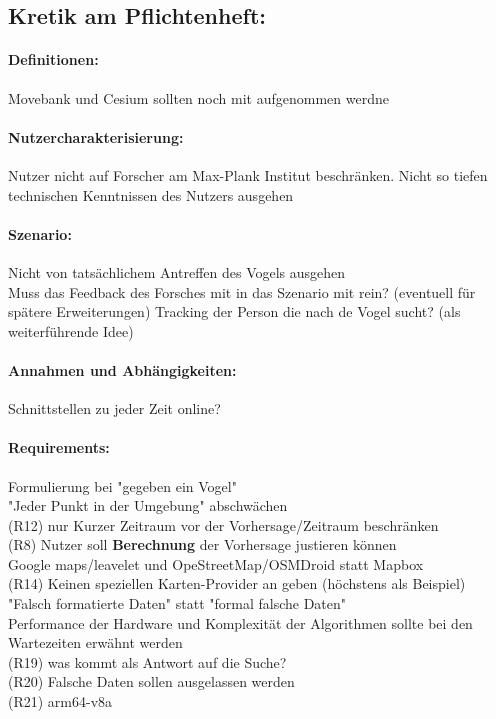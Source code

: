 \documentclass{article}
\begin{document}
	
	\subsection*{Kretik am Pflichtenheft:}
	
	\paragraph{Definitionen:}
	
	Movebank und Cesium sollten noch mit aufgenommen werdne
	
	\paragraph{Nutzercharakterisierung:}
	
	Nutzer nicht auf Forscher am Max-Plank Institut beschränken. Nicht so tiefen technischen Kenntnissen des Nutzers ausgehen
	
	\paragraph{Szenario:}
	
	Nicht von tatsächlichem Antreffen des Vogels ausgehen\\
	Muss das Feedback des Forsches mit in das Szenario mit rein? (eventuell für spätere Erweiterungen)
	Tracking der Person die nach de Vogel sucht? (als weiterführende Idee)
	
	\paragraph{Annahmen und Abhängigkeiten:}
	
	Schnittstellen zu jeder Zeit online?
	
	\paragraph{Requirements:} Formulierung bei "gegeben ein Vogel"\\
	"Jeder Punkt in der Umgebung" abschwächen\\
	(R12) nur Kurzer Zeitraum vor der Vorhersage/Zeitraum beschränken\\
	(R8) Nutzer soll \textbf{Berechnung} der Vorhersage justieren können\\
	Google maps/leavelet und OpeStreetMap/OSMDroid statt Mapbox\\
	(R14) Keinen speziellen Karten-Provider an geben (höchstens als Beispiel)\\
	"Falsch formatierte Daten" statt "formal falsche Daten"\\
	Performance der Hardware und Komplexität der Algorithmen sollte bei den Wartezeiten erwähnt werden\\
	(R19) was kommt als Antwort auf die Suche?\\
	(R20) Falsche Daten sollen ausgelassen werden\\
	(R21) arm64-v8a\\
	
\end{document}
